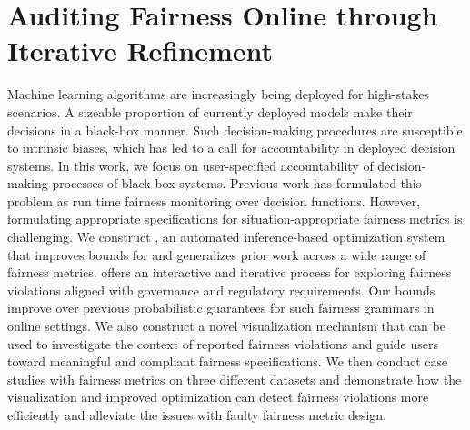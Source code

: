 \chapter{Auditing Fairness Online through Iterative Refinement}
\label{chp:avoir}

Machine learning algorithms are increasingly being deployed for high-stakes scenarios. 
A sizeable proportion of currently deployed models make their decisions in a black-box manner. 
Such decision-making procedures are susceptible to intrinsic biases, which has led to a call for accountability in deployed decision systems.
In this work, we focus on user-specified accountability of decision-making processes of black box systems.
Previous work has formulated this problem as run time fairness monitoring over decision functions.
However, formulating appropriate specifications for situation-appropriate fairness metrics is challenging.
We construct \AVOIRmethodname{}, an automated inference-based optimization system that improves bounds for and generalizes prior work across a wide range of fairness metrics.
\AVOIRmethodname{} offers an interactive and iterative process for exploring fairness violations aligned with governance and regulatory requirements.
Our bounds improve over previous probabilistic guarantees for such fairness grammars in online settings.
We also construct a novel visualization mechanism that can be used to investigate the context of reported fairness violations and guide users toward meaningful and compliant fairness specifications. 
We then conduct case studies with fairness metrics on three different datasets and demonstrate how the visualization and improved optimization can detect fairness violations more efficiently and alleviate the issues with faulty fairness metric design. 













\endinput